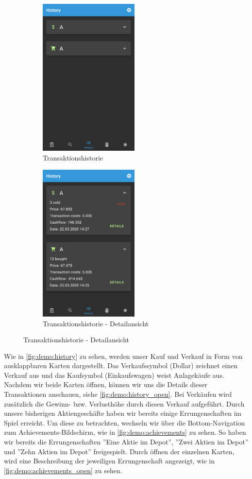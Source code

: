 \documentclass[a4paper]{article}
\begin{document}
\begin{figure}[H]
	\begin{subfigure}{.5\textwidth}
		\centering
		\includegraphics[height=8cm,keepaspectratio]{./images/demo/history_closed.png}
		\caption{Transaktionshistorie}
		\label{fig:demo:history}
	\end{subfigure}
	\begin{subfigure}{.5\textwidth}
		\centering
		\includegraphics[height=8cm,keepaspectratio]{./images/demo/history_open.png}
		\caption{Transaktionshistorie - Detailansicht}
		\label{fig:demo:history_open}
	\end{subfigure}
\end{figure}

Wie in \autoref{fig:demo:history} zu sehen, werden unser Kauf und Verkauf in Form von ausklappbaren Karten dargestellt. Das Verkaufssymbol (Dollar) zeichnet einen Verkauf aus und das Kaufsymbol (Einkaufswagen) weist Anlagekäufe aus. Nachdem wir beide Karten öffnen, können wir uns die Details dieser Transaktionen anschauen, siehe \autoref{fig:demo:history_open}. Bei Verkäufen wird zusätzlich die Gewinn- bzw. Verlusthöhe durch diesen Verkauf aufgeführt.\newline
Durch unsere bisherigen Aktiengeschäfte haben wir bereits einige Errungenschaften im Spiel erreicht. Um diese zu betrachten, wechseln wir über die Bottom-Navigation zum Achievements-Bildschirm, wie in \autoref{fig:demo:achievements} zu sehen. So haben wir bereits die Errungenschaften ''Eine Aktie im Depot'', ''Zwei Aktien im Depot'' und ''Zehn Aktien im Depot'' freigespielt. Durch öffnen der einzelnen Karten, wird eine Beschreibung der jeweiligen Errungenschaft angezeigt, wie in  \autoref{fig:demo:achievements_open} zu sehen.
\end{document}
